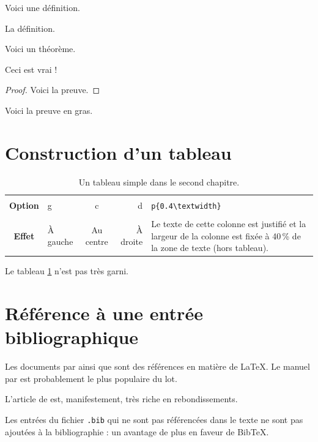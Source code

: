 Voici une définition.
\begin{deff}[La définition]
	La définition.
\end{deff}
Voici un théor\`eme.
\begin{theo}[Titre]
	Ceci est vrai !
\end{theo}
\begin{proof}
	Voici la preuve.
\end{proof}
\begin{demo}
	Voici la preuve en gras.
\end{demo}


\section{Construction d'un tableau}

\begin{table}[htb]
	\centering
	\caption{Un tableau simple dans le second chapitre.}
	\label{tab:simple2}
	\begin{tabular}{|c||l|c|r|p{}|}
		\hline			&			&			&			&																															\\
		\textbf{Option}	& g			& c			& d			& \verb|p{0.4\textwidth}|																									\\[3mm]
		\hline\hline	&			&			&			&																															\\
		\textbf{Effet}	& À gauche	& Au centre	& À droite	& Le texte de cette colonne est justifié et la largeur de la colonne est fixée \`a 40\,\% de la zone de texte (hors tableau).	\\[3mm]
		\hline 
	\end{tabular}
\end{table}
Le tableau \ref{tab:simple2} n'est pas tr\`es garni.

\section{Référence \`a une entrée bibliographique}

Les documents par \citet{Lamport1986,GMS1994} ainsi que \citet{Spivak1990} 
sont des références en mati\`ere de \LaTeX. Le manuel par 
\citet{GMS1994} est probablement le plus populaire du lot.

L'article de \citet{Martin1992} est, manifestement, tr\`es riche en rebondissements.

Les entrées du fichier \verb|.bib| qui ne sont pas référencées 
dans le texte ne sont pas ajoutées \`a la bibliographie : un avantage 
de plus en faveur de Bib\TeX.

